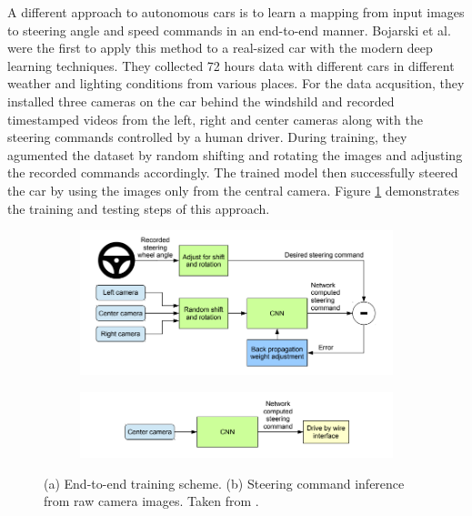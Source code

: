 A different approach to autonomous cars is to learn a mapping from input images
to steering angle and speed commands in an end-to-end manner. Bojarski et al.
\cite{Bojarski2016EndTE} were the first to apply this method to a real-sized
car with the modern deep learning techniques. They collected 72 hours data
with different cars in different weather and lighting conditions from various
places. For the data acqusition, they installed three cameras on the car behind
the windshild and recorded timestamped videos from the left, right and center
cameras along with the steering commands controlled by a human driver. During
training, they agumented the dataset by random shifting and rotating the images
and adjusting the recorded commands accordingly. The trained model then
successfully steered the car by using the images only from the central camera.
Figure \ref{figure:end-to-end-network} demonstrates the training and testing
steps of this approach.

\begin{figure}[h]
  \centering
  \begin{subfigure}[b]{1.0\linewidth}
    \includegraphics[width=\linewidth]{figures/end-to-end-training.png}
    \caption{}
  \end{subfigure}
  \begin{subfigure}[b]{1.0\linewidth}
    \includegraphics[width=\linewidth]{figures/end-to-end-inference.png}
    \caption{}
  \end{subfigure}
  \caption[End-to-end training and inference]{(a) End-to-end training scheme.
    (b) Steering command inference from raw camera images. Taken from
    \cite{Bojarski2016EndTE}.}
  \label{figure:end-to-end-network}
\end{figure}

